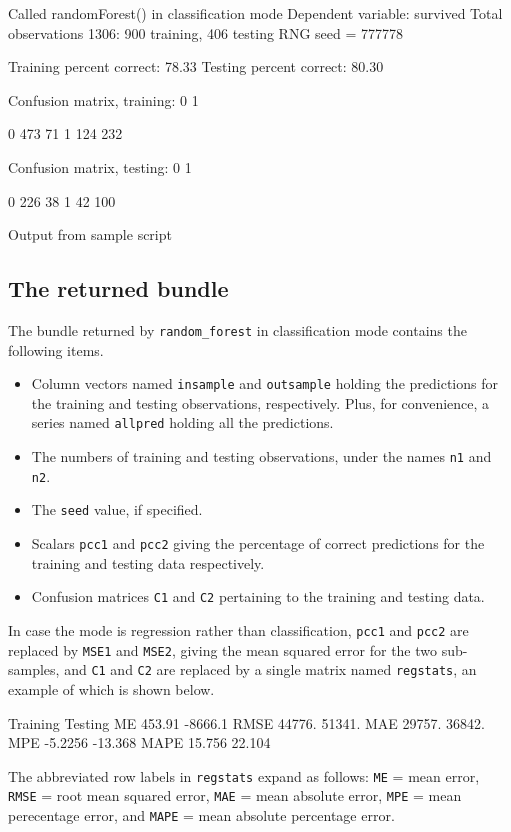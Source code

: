 \documentclass{article}
\begin{document}
\begin{script}[htbp]
  \begin{scodebit}
Called randomForest() in classification mode
Dependent variable: survived
Total observations 1306: 900 training, 406 testing
RNG seed = 777778

Training percent correct: 78.33
Testing percent correct:  80.30

Confusion matrix, training:
             0            1

0          473           71
1          124          232

Confusion matrix, testing:
             0            1

0          226           38
1           42          100
\end{scodebit}
  \caption{Output from sample script}
  \label{output}
\end{script}

\subsection{The returned bundle}

The bundle returned by \texttt{random\_forest} in classification mode
contains the following items.
\begin{itemize}
\item Column vectors named \texttt{insample} and \texttt{outsample}
  holding the predictions for the training and testing observations,
  respectively. Plus, for convenience, a series named \texttt{allpred}
  holding all the predictions.
\item The numbers of training and testing observations, under the
  names \texttt{n1} and \texttt{n2}.
\item The \texttt{seed} value, if specified.  
\item Scalars \texttt{pcc1} and \texttt{pcc2} giving the percentage of
  correct predictions for the training and testing data respectively.
\item Confusion matrices \texttt{C1} and \texttt{C2} pertaining to the
  training and testing data.
\end{itemize}

In case the mode is regression rather than classification,
\texttt{pcc1} and \texttt{pcc2} are replaced by \texttt{MSE1} and
\texttt{MSE2}, giving the mean squared error for the two sub-samples,
and \texttt{C1} and \texttt{C2} are replaced by a single matrix named
\texttt{regstats}, an example of which is shown below.
%
\begin{code}
         Training      Testing 
  ME       453.91      -8666.1 
RMSE       44776.       51341. 
 MAE       29757.       36842. 
 MPE      -5.2256      -13.368 
MAPE       15.756       22.104
\end{code}
%
The abbreviated row labels in \texttt{regstats} expand as follows:
\texttt{ME} = mean error, \texttt{RMSE} = root mean squared error,
\texttt{MAE} = mean absolute error, \texttt{MPE} = mean perecentage
error, and \texttt{MAPE} = mean absolute percentage error.
\end{document}
